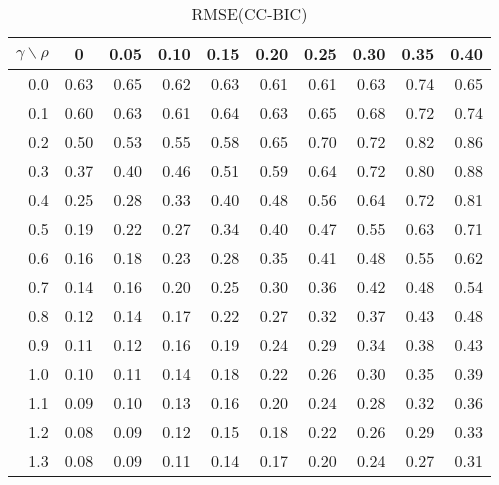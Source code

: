 \documentclass[12pt]{article}
\begin{document}
\begin{table}[!tbp]
\caption{RMSE(CC-BIC)}
 \begin{center}
 \begin{tabular}{r|rrrrrrrrr}\hline\hline
\multicolumn{1}{c|}{$\gamma\backslash\rho$}&\multicolumn{1}{c}{0}&\multicolumn{1}{c}{0.05}&\multicolumn{1}{c}{0.10}&\multicolumn{1}{c}{0.15}&\multicolumn{1}{c}{0.20}&\multicolumn{1}{c}{0.25}&\multicolumn{1}{c}{0.30}&\multicolumn{1}{c}{0.35}&\multicolumn{1}{c}{0.40}\tabularnewline
\hline


0.0&0.63&0.65&0.62&0.63&0.61&0.61&0.63&0.74&0.65\tabularnewline
0.1&0.60&0.63&0.61&0.64&0.63&0.65&0.68&0.72&0.74\tabularnewline
0.2&0.50&0.53&0.55&0.58&0.65&0.70&0.72&0.82&0.86\tabularnewline
0.3&0.37&0.40&0.46&0.51&0.59&0.64&0.72&0.80&0.88\tabularnewline
0.4&0.25&0.28&0.33&0.40&0.48&0.56&0.64&0.72&0.81\tabularnewline
0.5&0.19&0.22&0.27&0.34&0.40&0.47&0.55&0.63&0.71\tabularnewline
0.6&0.16&0.18&0.23&0.28&0.35&0.41&0.48&0.55&0.62\tabularnewline
0.7&0.14&0.16&0.20&0.25&0.30&0.36&0.42&0.48&0.54\tabularnewline
0.8&0.12&0.14&0.17&0.22&0.27&0.32&0.37&0.43&0.48\tabularnewline
0.9&0.11&0.12&0.16&0.19&0.24&0.29&0.34&0.38&0.43\tabularnewline
1.0&0.10&0.11&0.14&0.18&0.22&0.26&0.30&0.35&0.39\tabularnewline
1.1&0.09&0.10&0.13&0.16&0.20&0.24&0.28&0.32&0.36\tabularnewline
1.2&0.08&0.09&0.12&0.15&0.18&0.22&0.26&0.29&0.33\tabularnewline
1.3&0.08&0.09&0.11&0.14&0.17&0.20&0.24&0.27&0.31\tabularnewline
\hline
\end{tabular}

\end{center}

\end{table}

%
\end{document}
